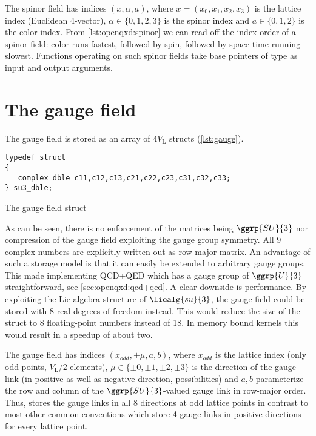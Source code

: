 The spinor field has indices $(x, \alpha, a)$, where $x=(x_0,x_1,x_2,x_3)$ is the lattice index (Euclidean 4-vector), $\alpha \in \{0,1,2,3\}$ is the spinor index and $a \in \{0,1,2\}$ is the color index.
From \cref{lst:openqxd:spinor} we can read off the index order of a spinor field: color runs fastest, followed by spin, followed by space-time running slowest.
Functions operating on such spinor fields take base pointers of type  as input and output arguments.

\section{The gauge field}
\label{sec:openqxd:gauge:field}

The gauge field is stored as an array of $4V_\mathrm{L}$  structs (\cref{lst:gauge}).
\begin{codelisting}
\begin{verbatim}
typedef struct
{
   complex_dble c11,c12,c13,c21,c22,c23,c31,c32,c33;
} su3_dble;
\end{verbatim}
\caption{The gauge field struct}
\label{lst:gauge}
\end{codelisting}
As can be seen, there is no enforcement of the matrices being $\ggrp{SU}{3}$ nor compression of the gauge field exploiting the gauge group symmetry. All \num{9} complex numbers are explicitly written out as row-major matrix. An advantage of such a storage model is that it can easily be extended to arbitrary gauge groups. This made implementing QCD+QED which has a gauge group of $\ggrp{U}{3}$ straightforward, see \cref{sec:openqxd:qcd+qed}. A clear downside is performance. By exploiting the Lie-algebra structure of $\liealg{su}{3}$, the gauge field could be stored with \num{8} real degrees of freedom instead. This would reduce the size of the struct to \num{8} floating-point numbers instead of \num{18}. In memory bound kernels this would result in a speedup of about two.

The gauge field has indices $(x_{odd}, \pm \mu, a, b)$, where $x_{odd}$ is the lattice index (only odd points, $V_\mathrm{L}/2$ elements), $\mu \in \{\pm 0, \pm 1, \pm 2, \pm 3\}$ is the direction of the gauge link (in positive as well as negative direction,  possibilities) and $a,b$ parameterize the row and column of the $\ggrp{SU}{3}$-valued gauge link in row-major order.
Thus, \openqxd stores the gauge links in all \num{8} directions at odd lattice points in contrast to most other common conventions which store \num{4} gauge links in positive directions for every lattice point.

